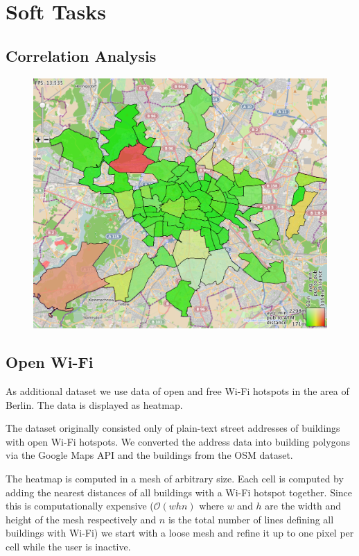 \section*{Soft Tasks}
\subsection*{Correlation Analysis}

\todo{}

\begin{figure}
\centering
\includegraphics[width=0.9\linewidth]{imgs/crawl}
\caption{\todo{}}
\label{fig:crawl}
\end{figure}

\subsection*{Open Wi-Fi}

As additional dataset we use data of open and free Wi-Fi hotspots in
the area of Berlin.
The data is displayed as heatmap.

The dataset originally consisted only of plain-text street addresses
of buildings with open Wi-Fi hotspots. We converted the
address data into building polygons via the Google Maps
API and the buildings from the OSM dataset.

The heatmap is computed in a mesh of
arbitrary size. Each cell is computed by adding
the nearest distances of all buildings with a Wi-Fi
hotspot together.
Since this is computationally expensive ($\mathcal{O}(whn)$ where $w$ and $h$
are the width and height of the mesh respectively and $n$ is the total number of lines
defining all buildings with Wi-Fi)
we start with a loose mesh and refine it up to one pixel per cell while the
user is inactive.

